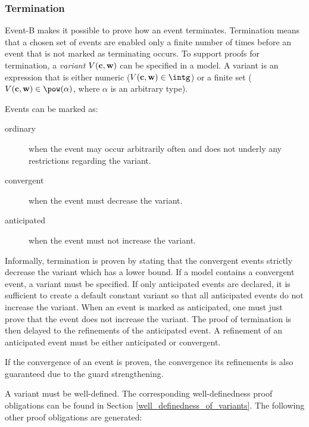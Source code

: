 \subsubsection{Termination}
\label{termination}
Event-B makes it possible to prove how an event terminates.
Termination means that a chosen set of events are enabled only a finite number
 of times before an event that is not marked as terminating occurs.
To support proofs for termination, a \emph{variant} $V(\mathbf{c},\mathbf{w})$ can be specified in a model.
A variant is an expression that is either numeric 
 ($V(\allconstants,\concvariables)\in\intg$) or
 a finite set ($V(\allconstants,\concvariables)\in\pow(\alpha)$,
 where $\alpha$ is an arbitrary type).

Events can be marked as:
\begin{description}
\item[ordinary] when the event may occur arbitrarily often and does not underly any restrictions
  regarding the variant.
\item[convergent] when the event must decrease the variant.
\item[anticipated] when the event must not increase the variant.
\end{description}
Informally, termination is proven by stating that the convergent events strictly decrease the variant
  which has a lower bound.
If a model contains a convergent event, a variant must be specified.
If only anticipated events are declared, it is sufficient to create a default constant variant so
  that all anticipated events do not increase the variant.
When an event is marked as anticipated, one must just prove that the event does not increase the
  variant.
The proof of termination is then delayed to the refinements of the anticipated event.
A refinement of an anticipated event must be either anticipated or convergent.

If the convergence of an event is proven, the convergence its refinements is also guaranteed due to
  the guard strengthening.

A variant must be well-defined. The corresponding well-definedness proof obligations
  can be found in Section \ref{well_definedness_of_variants}.
The following other proof obligations are generated:

